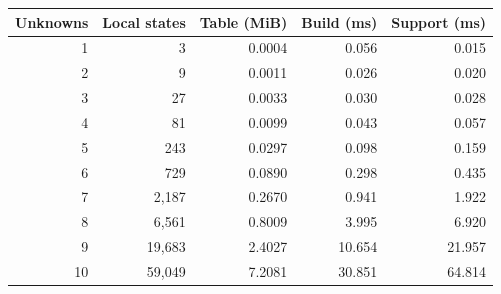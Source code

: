 \begin{tabular}{rrrrr}
\toprule
Unknowns & Local states & Table (MiB) & Build (ms) & Support (ms)\\
\midrule
1 & 3 & 0.0004 & 0.056 & 0.015\\
2 & 9 & 0.0011 & 0.026 & 0.020\\
3 & 27 & 0.0033 & 0.030 & 0.028\\
4 & 81 & 0.0099 & 0.043 & 0.057\\
5 & 243 & 0.0297 & 0.098 & 0.159\\
6 & 729 & 0.0890 & 0.298 & 0.435\\
7 & 2,187 & 0.2670 & 0.941 & 1.922\\
8 & 6,561 & 0.8009 & 3.995 & 6.920\\
9 & 19,683 & 2.4027 & 10.654 & 21.957\\
10 & 59,049 & 7.2081 & 30.851 & 64.814\\
\bottomrule
\end{tabular}
